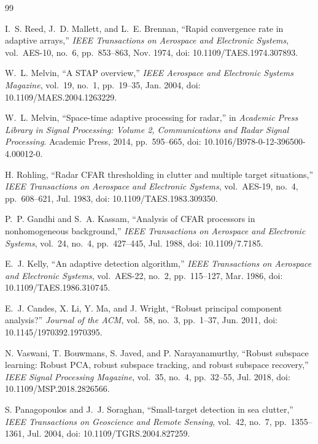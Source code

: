 \documentclass[journal]{IEEEtran}
\begin{document}
\begingroup
\fontsize{7.5}{8.5}\selectfont
\begin{thebibliography}{99}

I.~S. Reed, J.~D. Mallett, and L.~E. Brennan, ``Rapid convergence rate in adaptive arrays,'' \emph{IEEE Transactions on Aerospace and Electronic Systems}, vol.~AES-10, no.~6, pp.~853--863, Nov. 1974, doi: 10.1109/TAES.1974.307893.

W.~L. Melvin, ``A STAP overview,'' \emph{IEEE Aerospace and Electronic Systems Magazine}, vol.~19, no.~1, pp.~19--35, Jan. 2004, doi: 10.1109/MAES.2004.1263229.

W.~L. Melvin, ``Space-time adaptive processing for radar,'' in \emph{Academic Press Library in Signal Processing: Volume 2, Communications and Radar Signal Processing}. Academic Press, 2014, pp.~595--665, doi: 10.1016/B978-0-12-396500-4.00012-0.

H. Rohling, ``Radar CFAR thresholding in clutter and multiple target situations,'' \emph{IEEE Transactions on Aerospace and Electronic Systems}, vol.~AES-19, no.~4, pp.~608--621, Jul. 1983, doi: 10.1109/TAES.1983.309350.

P.~P. Gandhi and S.~A. Kassam, ``Analysis of CFAR processors in nonhomogeneous background,'' \emph{IEEE Transactions on Aerospace and Electronic Systems}, vol.~24, no.~4, pp.~427--445, Jul. 1988, doi: 10.1109/7.7185.

E.~J. Kelly, ``An adaptive detection algorithm,'' \emph{IEEE Transactions on Aerospace and Electronic Systems}, vol.~AES-22, no.~2, pp.~115--127, Mar. 1986, doi: 10.1109/TAES.1986.310745.

E.~J. Candes, X. Li, Y. Ma, and J. Wright, ``Robust principal component analysis?'' \emph{Journal of the ACM}, vol.~58, no.~3, pp.~1--37, Jun. 2011, doi: 10.1145/1970392.1970395.

N. Vaswani, T. Bouwmans, S. Javed, and P. Narayanamurthy, ``Robust subspace learning: Robust PCA, robust subspace tracking, and robust subspace recovery,'' \emph{IEEE Signal Processing Magazine}, vol.~35, no.~4, pp.~32--55, Jul. 2018, doi: 10.1109/MSP.2018.2826566.

S. Panagopoulos and J.~J. Soraghan, ``Small-target detection in sea clutter,'' \emph{IEEE Transactions on Geoscience and Remote Sensing}, vol.~42, no.~7, pp.~1355--1361, Jul. 2004, doi: 10.1109/TGRS.2004.827259.


\end{thebibliography}
\end{document}
